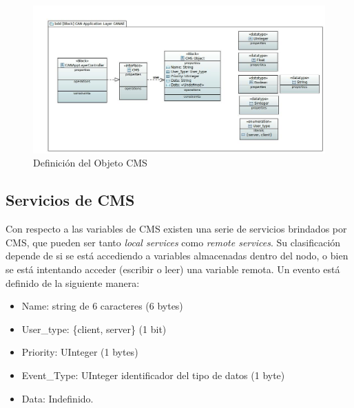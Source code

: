 \begin{figure}[h!]
 \centering
 \includegraphics[scale=0.4]{images/Secciones/AppendixA/CMSObject.JPG}
  \caption{Definición del Objeto CMS}
\label{fig:CMSObject}
\end{figure} 

\subsection{Servicios de CMS}
Con respecto a las variables de CMS existen una serie de servicios brindados por CMS, que pueden ser tanto \textit{local services} como \textit{remote services}. Su clasificación depende de si se está accediendo a variables almacenadas dentro del nodo, o bien se está intentando acceder (escribir o leer) una variable remota. Un evento está definido de la siguiente manera:

\begin{itemize}
   \item Name: string de 6 caracteres (6 bytes)
   \item User\_type: \{client, server\} (1 bit)
   \item Priority: UInteger (1 bytes)
   \item Event\_Type: UInteger identificador del tipo de datos (1 byte)
   \item Data: Indefinido.
\end{itemize}


